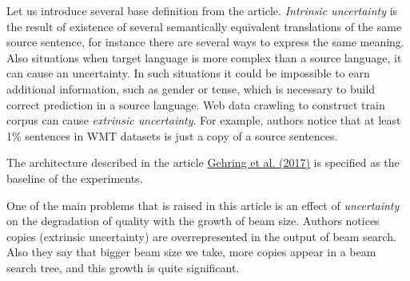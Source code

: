 \documentclass[a4paper,14pt]{extarticle}
\newcommand{\bibref}[3]{\hyperlink{#1}{#2 (#3)}}
\begin{document}
	Let us introduce several base definition from the article. \textit{Intrinsic uncertainty} is the result of existence of several semantically equivalent translations of the same source sentence, for instance there are several ways to express the same meaning. Also situations when target language is more complex than a source language, it can cause an uncertainty. In such situations it could be impossible to earn additional information, such as gender or tense, which is necessary to build correct prediction in a source language. Web data crawling to construct train corpus can cause \textit{extrinsic uncertainty}. For example, authors notice that at least 1\% sentences in WMT datasets is just a copy of a source sentences.
	
	The architecture described in the article \bibref{fconv}{Gehring et al.}{2017} is specified as the baseline of the experiments.
	
	One of the main problems that is raised in this article is an effect of \textit{uncertainty} on the degradation of quality with the growth of beam size. Authors notices copies (extrinsic uncertainty) are overrepresented in the output of beam search. Also they say that bigger beam size we take, more copies appear in a beam search tree, and this growth is quite significant.
	
	\begin{figure}[t]
	\end{figure}
	
\end{document}
